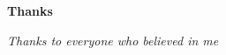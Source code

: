\thispagestyle{empty}

\begin{center}
  {\bf \Huge Thanks}
\end{center}

\vspace{4cm}


\emph{
  Thanks to everyone who believed in me
}
